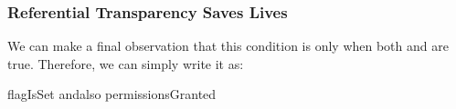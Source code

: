 \documentclass[aspectratio=169]{beamer}
\begin{document}
\begin{frame}[fragile]
  \frametitle{Referential Transparency Saves Lives}

  We can make a final observation that this condition is only
   when both  and 
  are true. Therefore, we can simply write it as:

  \pause
  \vspace{\fill}

  \begin{codeblock}
    flagIsSet andalso permissionsGranted
  \end{codeblock}

  \pause
  \vspace{\fill}


\end{frame}












\end{document}
